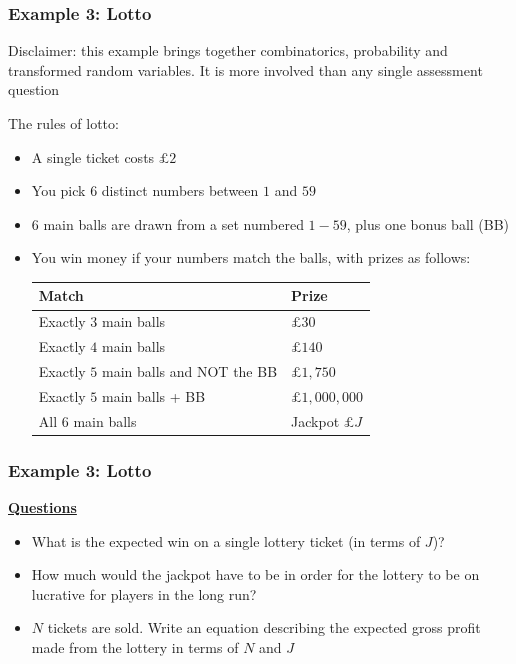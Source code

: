 \documentclass[t,8pt]{beamer}%
\begin{document}
\begin{frame}
\frametitle{Example 3: Lotto}
Disclaimer: this example brings together combinatorics, probability and transformed random variables. It is more involved than any single assessment question \par
The rules of lotto:
\begin{itemize}
    \item A single ticket costs $\pounds 2$
    \item You pick $6$ distinct numbers between $1$ and $59$
    \item $6$ main balls are drawn from a set numbered $1-59$, plus one bonus ball (BB)
    \item You win money if your numbers match the balls, with prizes as follows:
    \begin{table}
    \centering
    \begin{tabular}{|l|l|}
    \hline 
    Match & Prize \\ \hline
    Exactly $3$ main balls & $\pounds 30$ \\
    Exactly $4$ main balls & $\pounds 140$ \\
    Exactly $5$ main balls and NOT the BB & $\pounds 1,750$ \\
    Exactly $5$ main balls + BB & $\pounds 1,000,000$ \\
    All $6$ main balls & Jackpot $\pounds J$ \\ \hline
    \end{tabular}
    \end{table}
\end{itemize}
\end{frame}

\begin{frame}
\frametitle{Example 3: Lotto}
{\bf\underline{Questions}} \par
\begin{itemize}
    \item What is the expected win on a single lottery ticket (in terms of $J$)?
    \item How much would the jackpot have to be in order for the lottery to be on lucrative for players in the long run?
    \item $N$ tickets are sold. Write an equation describing the expected gross profit made from the lottery in terms of $N$ and $J$
\end{itemize}
\end{frame}
\end{document}
